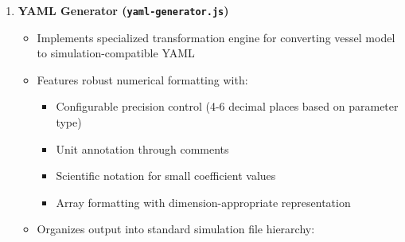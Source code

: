 \documentclass[
  letterpaper,
  DIV=11,
  numbers=noendperiod]{scrreprt}
\providecommand{\tightlist}{%
  \setlength{\itemsep}{0pt}\setlength{\parskip}{0pt}}\usepackage{longtable,booktabs,array}
\begin{document}
\begin{enumerate}
\begin{itemize}
    \begin{itemize}
    \tightlist
    \item
      Physical properties (dimensions, mass, centers)
    \item
      Hydrodynamic coefficients (added mass, damping, restoring forces)
    \item
      Component collections (control surfaces, thrusters, sensors)
    \item
      Simulation parameters (time step, environment, boundary
      conditions)
    \end{itemize}
  \item
    Provides transaction-based modification methods with validation:

    \begin{itemize}
    \tightlist
    \item
      Addition, update, and removal operations for all component types
    \item
      Auto-incrementing ID allocation for component tracking
    \item
      Reference integrity management between components
    \item
      Unit conversion and normalization for consistent data
      representation
    \end{itemize}
  \item
    Implements bidirectional mapping between model data and 3D objects
    using UUID tracking
  \item
    Maintains persistence through JSON serialization/deserialization
    with state version control
  \item
    Supports incremental updates through partial property modification
    methods
  \end{itemize}
\item
  \textbf{YAML Generator (\texttt{yaml-generator.js})}

  \begin{itemize}
  \tightlist
  \item
    Implements specialized transformation engine for converting vessel
    model to simulation-compatible YAML
  \item
    Features robust numerical formatting with:

    \begin{itemize}
    \tightlist
    \item
      Configurable precision control (4-6 decimal places based on
      parameter type)
    \item
      Unit annotation through comments
    \item
      Scientific notation for small coefficient values
    \item
      Array formatting with dimension-appropriate representation
    \end{itemize}
  \item
    Organizes output into standard simulation file hierarchy:


\end{itemize}
\end{enumerate}
\end{document}
